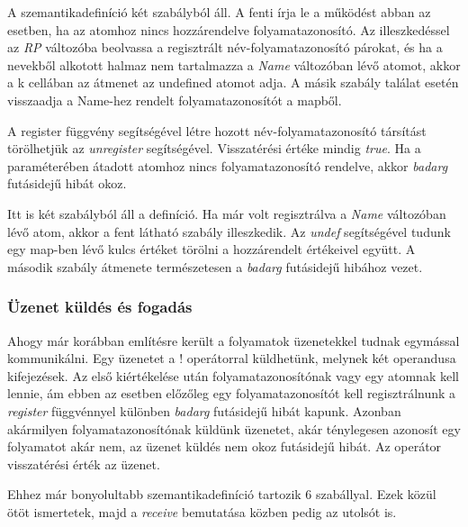 A szemantikadefiníció két szabályból áll. A fenti írja le a működést abban az esetben, ha az atomhoz nincs hozzárendelve folyamatazonosító. Az illeszkedéssel az \textit{RP} változóba beolvassa a regisztrált név-folyamatazonosító párokat, és ha a nevekből alkotott halmaz nem tartalmazza a \textit{Name} változóban lévő atomot, akkor a k cellában az átmenet az undefined atomot adja. A másik szabály találat esetén visszaadja a Name-hez rendelt folyamatazonosítót a mapből.

A register függvény segítségével létre hozott név-folyamatazonosító társítást törölhetjük az \textit{unregister} segítségével. Visszatérési értéke mindig \textit{true}. Ha a paraméterében átadott atomhoz nincs folyamatazonosító rendelve, akkor \textit{badarg} futásidejű hibát okoz.



Itt is két szabályból áll a definíció. Ha már volt regisztrálva a \textit{Name} változóban lévő atom, akkor a fent látható szabály illeszkedik. Az \textit{undef} segítségével tudunk egy map-ben lévő kulcs értéket törölni a hozzárendelt értékeivel együtt. A második szabály átmenete természetesen a \textit{badarg} futásidejű hibához vezet.

\subsubsection{Üzenet küldés és fogadás}

Ahogy már korábban említésre került a folyamatok üzenetekkel tudnak egymással kommunikálni. Egy üzenetet a ! operátorral küldhetünk, melynek két operandusa kifejezések. Az első kiértékelése után folyamatazonosítónak vagy egy atomnak kell lennie, ám ebben az esetben előzőleg egy folyamatazonosítót kell regisztrálnunk a \textit{register} függvénnyel különben \textit{badarg} futásidejű hibát kapunk. Azonban akármilyen folyamatazonosítónak küldünk üzenetet, akár ténylegesen azonosít egy folyamatot akár nem, az üzenet küldés nem okoz futásidejű hibát. Az operátor visszatérési érték az üzenet.

Ehhez már bonyolultabb szemantikadefiníció tartozik 6 szabállyal. Ezek közül ötöt ismertetek, majd a \textit{receive} bemutatása közben pedig az utolsót is.



